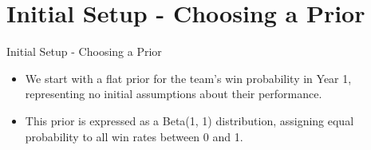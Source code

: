\section{Initial Setup - Choosing a Prior}

\begin{frame}{Initial Setup - Choosing a Prior}

  \begin{itemize}
    \item We start with a flat prior for the team’s win probability in Year 1, representing no initial assumptions about their performance.
    \item This prior is expressed as a Beta(1, 1) distribution, assigning equal probability to all win rates between 0 and 1.
  \end{itemize}
  
\end{frame}
